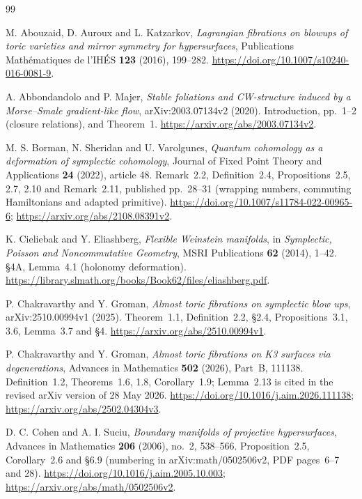 \begin{thebibliography}{99}

M. Abouzaid, D. Auroux and L. Katzarkov,
\emph{Lagrangian fibrations on blowups of toric varieties and mirror symmetry for hypersurfaces},
Publications Mathématiques de l'IHÉS \textbf{123} (2016), 199--282.
\url{https://doi.org/10.1007/s10240-016-0081-9}.

A. Abbondandolo and P. Majer,
\emph{Stable foliations and CW-structure induced by a Morse--Smale gradient-like flow},
arXiv:2003.07134v2 (2020).
Introduction, pp.~1--2 (closure relations), and Theorem~1.
\url{https://arxiv.org/abs/2003.07134v2}.

M. S. Borman, N. Sheridan and U. Varolgunes,
\emph{Quantum cohomology as a deformation of symplectic cohomology},
Journal of Fixed Point Theory and Applications \textbf{24} (2022), article 48.
Remark~2.2, Definition~2.4, Propositions~2.5, 2.7, 2.10 and Remark~2.11,
published pp.~28--31 (wrapping numbers, commuting Hamiltonians and adapted primitive).
\url{https://doi.org/10.1007/s11784-022-00965-6};
\url{https://arxiv.org/abs/2108.08391v2}.

K. Cieliebak and Y. Eliashberg,
\emph{Flexible Weinstein manifolds},
in \emph{Symplectic, Poisson and Noncommutative Geometry},
MSRI Publications \textbf{62} (2014), 1--42.
\S4A, Lemma~4.1 (holonomy deformation).
\url{https://library.slmath.org/books/Book62/files/eliashberg.pdf}.

P. Chakravarthy and Y. Groman,
\emph{Almost toric fibrations on symplectic blow ups},
arXiv:2510.00994v1 (2025).
Theorem~1.1, Definition~2.2, \S2.4, Propositions~3.1, 3.6, Lemma~3.7 and \S4.
\url{https://arxiv.org/abs/2510.00994v1}.

P. Chakravarthy and Y. Groman,
\emph{Almost toric fibrations on K3 surfaces via degenerations},
Advances in Mathematics \textbf{502} (2026), Part~B, 111138.
Definition~1.2, Theorems~1.6, 1.8, Corollary~1.9;
Lemma~2.13 is cited in the revised arXiv version of 28 May 2026.
\url{https://doi.org/10.1016/j.aim.2026.111138};
\url{https://arxiv.org/abs/2502.04304v3}.

D. C. Cohen and A. I. Suciu,
\emph{Boundary manifolds of projective hypersurfaces},
Advances in Mathematics \textbf{206} (2006), no.~2, 538--566.
Proposition~2.5, Corollary~2.6 and \S6.9 (numbering in arXiv:math/0502506v2,
PDF pages~6--7 and 28).
\url{https://doi.org/10.1016/j.aim.2005.10.003};
\url{https://arxiv.org/abs/math/0502506v2}.


\end{thebibliography}
